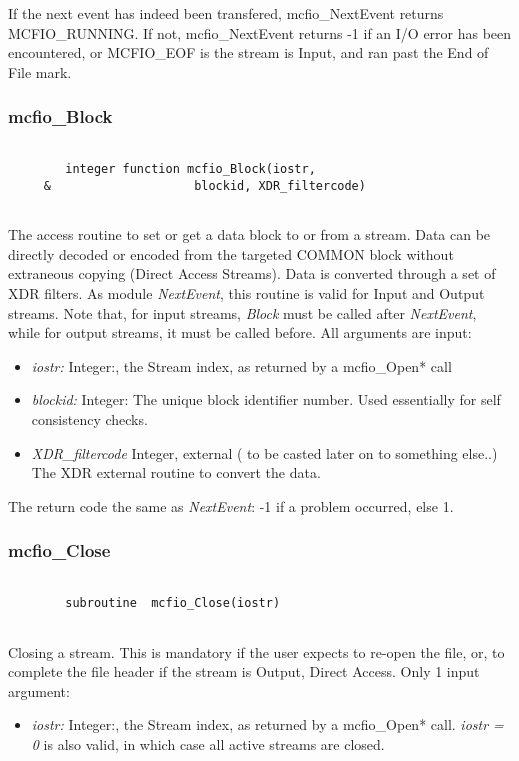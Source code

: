 	If the next event has indeed been transfered, mcfio\_NextEvent returns 
MCFIO\_RUNNING.  If not, mcfio\_NextEvent returns -1 if an I/O error has 
been encountered, or MCFIO\_EOF is the stream is Input, and ran past the 
End of File mark. 
	
\subsubsection{mcfio\_Block}

\begin{verbatim}

        integer function mcfio_Block(iostr,
     &                    blockid, XDR_filtercode)
     
\end{verbatim}
The access routine to set or get a data  block to or from a  stream. Data can
be directly decoded or encoded from the targeted  COMMON block without
extraneous copying (Direct Access Streams). Data is converted through a set of
XDR filters.  As module {\em NextEvent}, this routine is valid  for Input and
Output streams. Note that, for input streams, {\em Block} must be called after
{\em NextEvent}, while for output streams, it must be called before. All
arguments are input:

\begin{itemize} 
\item {\em iostr:} Integer:, the Stream index, as returned by a mcfio\_Open* 
call
\item{\em blockid:} Integer: The unique block identifier number. Used 
essentially for self consistency checks. 
\item{\em XDR\_filtercode} Integer, external
 ( to be casted later on to something else..)
  The XDR external routine to convert the data. 
\end{itemize}

	The return code the same as {\em NextEvent}: -1 if a problem occurred,
else 1. 

\subsubsection{mcfio\_Close}

\begin{verbatim}

        subroutine  mcfio_Close(iostr)
    
\end{verbatim}

Closing a stream. This is mandatory if the user expects to re-open the  file,
or, to complete the file header if the stream is Output, Direct Access. Only 
1 input argument:
\begin{itemize} 
\item {\em iostr:} Integer:, the Stream index, as returned by a mcfio\_Open* 
call. {\em iostr = 0} is also valid, in which case all active streams are
closed.
\end{itemize}


